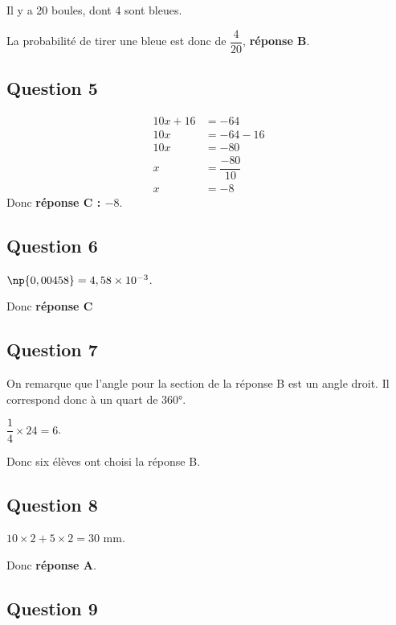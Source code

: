 \documentclass[12pt,a4paper,french]{article}
\begin{document}
Il y a 20 boules, dont 4 sont bleues.

La probabilité de tirer une bleue est donc de $\dfrac{4}{20}$,  \textbf{réponse B}.

\subsection*{Question 5}

\begin{align*}
10 x+16&=-64\\
10x&=-64-16\\
10x &=-80\\
x&=\dfrac{-80}{10}\\
x&=-8
\end{align*}
 Donc \textbf{réponse C : $-8$}.
\subsection*{Question 6}


$\np{0,00458}=4,58\times 10^{-3}$.

Donc \textbf{réponse C}

\subsection*{Question 7}


On remarque que l'angle pour la section de la réponse B est un angle droit. Il correspond donc à un quart de 360°.

$\dfrac{1}{4}\times 24=6$.

Donc six élèves ont choisi la réponse B.

\subsection*{Question 8}

$10\times 2 +5\times 2=30$ mm.

Donc \textbf{réponse A}.

\subsection*{Question 9}
\end{document}
